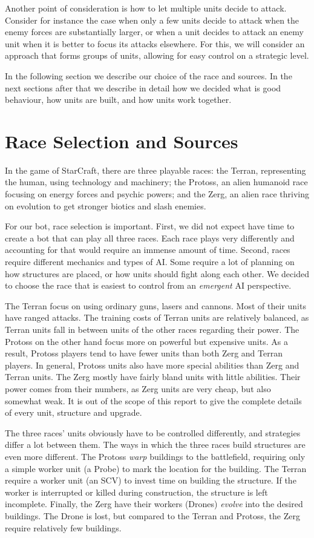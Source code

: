 Another point of consideration is how to let multiple units decide to attack. Consider for instance the case when only a few units decide to attack when the enemy forces are substantially larger, or when a unit decides to attack an enemy unit when it is better to focus its attacks elsewhere. For this, we will consider an approach that forms groups of units, allowing for easy control on a strategic level.

In the following section we describe our choice of the race and sources. In the next sections after that we describe in detail how we decided what is good behaviour, how units are built, and how units work together.

\section{Race Selection and Sources}
\label{strategy:race}
In the game of StarCraft, there are three playable races: the Terran, representing the human, using technology and machinery; the Protoss, an alien humanoid race focusing on energy forces and psychic powers; and the Zerg, an alien race thriving on evolution to get stronger biotics and slash enemies.

For our bot, race selection is important. First, we did not expect have time to create a bot that can play all three races. Each race plays very differently and accounting for that would require an immense amount of time. Second, races require different mechanics and types of AI. Some require a lot of planning on how structures are placed, or how units should fight along each other. We decided to choose the race that is easiest to control from an \emph{emergent} AI perspective.

The Terran focus on using ordinary guns, lasers and cannons. Most of their units have ranged attacks. The training costs of Terran units are relatively balanced, as Terran units fall in between units of the other races regarding their power. The Protoss on the other hand focus more on powerful but expensive units. As a result, Protoss players tend to have fewer units than both Zerg and Terran players. In general, Protoss units also have more special abilities than Zerg and Terran units. The Zerg mostly have fairly bland units with little abilities. Their power comes from their numbers, as Zerg units are very cheap, but also somewhat weak. It is out of the scope of this report to give the complete details of every unit, structure and upgrade.

The three races' units obviously have to be controlled differently, and strategies differ a lot between them. The ways in which the three races build structures are even more different. The Protoss \emph{warp} buildings to the battlefield, requiring only a simple worker unit (a Probe) to mark the location for the building. The Terran require a worker unit (an SCV) to invest time on building the structure. If the worker is interrupted or killed during construction, the structure is left incomplete. Finally, the Zerg have their workers (Drones) \emph{evolve} into the desired buildings. The Drone is lost, but compared to the Terran and Protoss, the Zerg require relatively few buildings.

